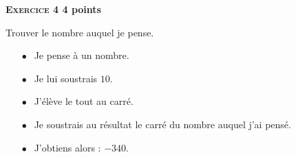 \textbf{\textsc{Exercice 4} \hfill 4 points}

\medskip

Trouver le nombre auquel je pense.

\setlength\parindent{1.5cm}
\begin{itemize}
\item[$\bullet~~$] Je pense à un nombre.
\item[$\bullet~~$] Je lui soustrais $10$.
\item[$\bullet~~$] J'élève le tout au carré.
\item[$\bullet~~$] Je soustrais au résultat le carré du nombre auquel j'ai pensé.
\item[$\bullet~~$] J'obtiens alors : $- 340$.
\end{itemize}
\setlength\parindent{0cm}

\vspace{0,5cm}

